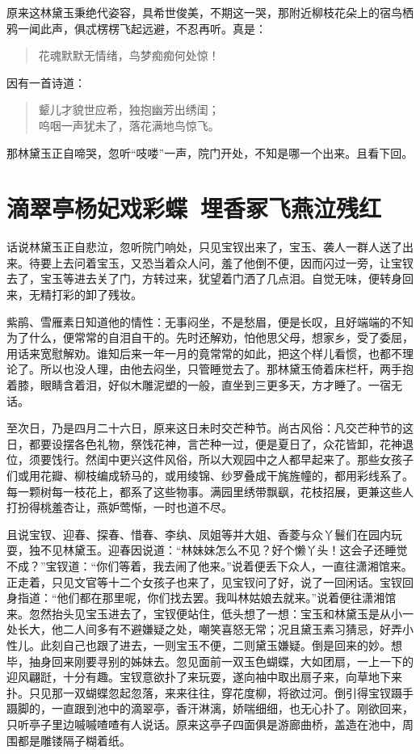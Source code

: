 \documentclass[12pt,oneside]{book}
\newenvironment{shici}{%
\begin{verse}%
\centering\large\hspace{12pt}}%
{\end{verse}}
\begin{document}
原来这林黛玉秉绝代姿容，具希世俊美，不期这一哭，那附近柳枝花朵上的宿鸟栖鸦一闻此声，俱忒楞楞飞起远避，不忍再听。真是：

\begin{shici}
花魂默默无情绪，鸟梦痴痴何处惊！
\end{shici}


因有一首诗道：

\begin{shici}
颦儿才貌世应希，独抱幽芳出绣闺；\\
呜咽一声犹未了，落花满地鸟惊飞。
\end{shici}


那林黛玉正自啼哭，忽听“吱喽”一声，院门开处，不知是哪一个出来。且看下回。



\chapter{滴翠亭杨妃戏彩蝶~埋香冢飞燕泣残红}
话说林黛玉正自悲泣，忽听院门响处，只见宝钗出来了，宝玉、袭人一群人送了出来。待要上去问着宝玉，又恐当着众人问，羞了他倒不便，因而闪过一旁，让宝钗去了，宝玉等进去关了门，方转过来，犹望着门洒了几点泪。自觉无味，便转身回来，无精打彩的卸了残妆。

紫鹃、雪雁素日知道他的情性：无事闷坐，不是愁眉，便是长叹，且好端端的不知为了什么，便常常的自泪自干的。先时还解劝，怕他思父母，想家乡，受了委屈，用话来宽慰解劝。谁知后来一年一月的竟常常的如此，把这个样儿看惯，也都不理论了。所以也没人理，由他去闷坐，只管睡觉去了。那林黛玉倚着床栏杆，两手抱着膝，眼睛含着泪，好似木雕泥塑的一般，直坐到三更多天，方才睡了。一宿无话。

至次日，乃是四月二十六日，原来这日未时交芒种节。尚古风俗：凡交芒种节的这日，都要设摆各色礼物，祭饯花神，言芒种一过，便是夏日了，众花皆卸，花神退位，须要饯行。然闺中更兴这件风俗，所以大观园中之人都早起来了。那些女孩子们或用花瓣、柳枝编成轿马的，或用绫锦、纱罗叠成干旄旌幢的，都用彩线系了。每一颗树每一枝花上，都系了这些物事。满园里绣带飘飖，花枝招展，更兼这些人打扮得桃羞杏让，燕妒莺惭，一时也道不尽。

且说宝钗、迎春、探春、惜春、李纨、凤姐等并大姐、香菱与众丫鬟们在园内玩耍，独不见林黛玉。迎春因说道：“林妹妹怎么不见？好个懒丫头！这会子还睡觉不成？”宝钗道：“你们等着，我去闹了他来。”说着便丢下众人，一直往潇湘馆来。正走着，只见文官等十二个女孩子也来了，见宝钗问了好，说了一回闲话。宝钗回身指道：“他们都在那里呢，你们找去罢。我叫林姑娘去就来。”说着便往潇湘馆来。忽然抬头见宝玉进去了，宝钗便站住，低头想了一想：宝玉和林黛玉是从小一处长大，他二人间多有不避嫌疑之处，嘲笑喜怒无常；况且黛玉素习猜忌，好弄小性儿。此刻自己也跟了进去，一则宝玉不便，二则黛玉嫌疑。倒是回来的妙。想毕，抽身回来刚要寻别的姊妹去。忽见面前一双玉色蝴蝶，大如团扇，一上一下的迎风翩跹，十分有趣。宝钗意欲扑了来玩耍，遂向袖中取出扇子来，向草地下来扑。只见那一双蝴蝶忽起忽落，来来往往，穿花度柳，将欲过河。倒引得宝钗蹑手蹑脚的，一直跟到池中的滴翠亭，香汗淋漓，娇喘细细，也无心扑了。刚欲回来，只听亭子里边嘁嘁喳喳有人说话。原来这亭子四面俱是游廊曲桥，盖造在池中，周围都是雕镂隔子糊着纸。
\end{document}
